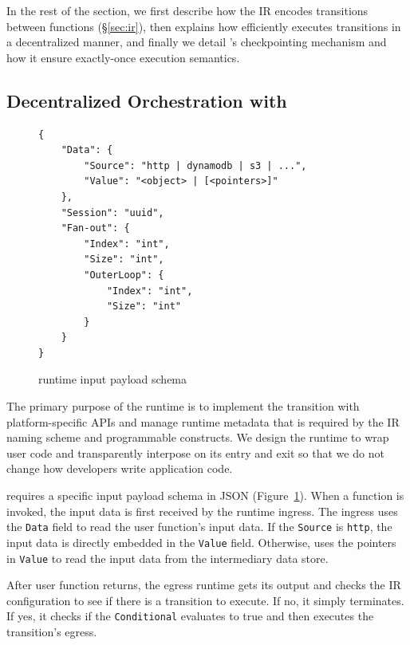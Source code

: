 In the rest of the section, we first describe how the \name{} IR encodes
transitions between functions (\S\ref{sec:ir}), then explains how \deorc{}
efficiently executes transitions in a decentralized manner, and finally we
detail \name{}'s checkpointing mechanism and how it ensure exactly-once
execution semantics.

% 
% 




\subsection{Decentralized Orchestration with \deorc{}}

\begin{figure}[]
    \begin{verbatim}
{
    "Data": {
        "Source": "http | dynamodb | s3 | ...",
        "Value": "<object> | [<pointers>]"
    },
    "Session": "uuid",
    "Fan-out": {
        "Index": "int",
        "Size": "int",
        "OuterLoop": {
            "Index": "int",
            "Size": "int"
        }
    }
}
    \end{verbatim}
    \caption{\name{} runtime input payload schema}
    \label{fig:input-format}
\end{figure}

The primary purpose of the \name{} runtime is to implement the transition with
platform-specific APIs and manage runtime metadata that is required by the
\name{} IR naming scheme and programmable constructs. We design the runtime to
wrap user code and transparently interpose on its entry and exit so that we do
not change how developers write application code.

 \name{} requires a specific input payload schema in JSON
(Figure~\ref{fig:input-format}). When a function is invoked, the input data is
first received by the runtime ingress. The ingress uses the \texttt{Data}
field to read the user function's input data. If the \texttt{Source} is
\texttt{http}, the input data is directly embedded in the \texttt{Value}
field. Otherwise, \name{} uses the pointers in \texttt{Value} to read the
input data from the intermediary data store.

After user function returns, the egress runtime gets its output and checks the
IR configuration to see if there is a transition to execute. If no, it simply
terminates. If yes, it checks if the \texttt{Conditional} evaluates to true
and then executes the transition's egress.

